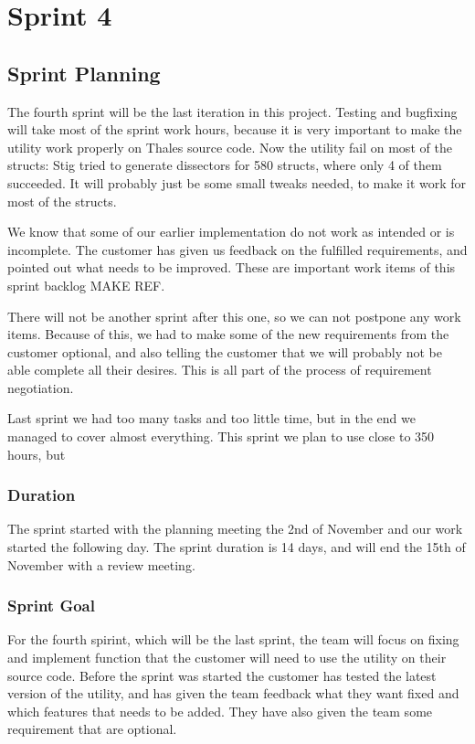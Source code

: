 \chapter{Sprint 4}


\section{Sprint Planning}
The fourth sprint will be the last iteration in this project. Testing and bugfixing will take most of the sprint work hours, because it is very important to make the utility work properly on Thales source code. Now the utility fail on most of the structs: Stig tried to generate dissectors for 580 structs, where only 4 of them succeeded. It will probably just be some small tweaks needed, to make it work for most of the structs.

We know that some of our earlier implementation do not work as intended or is incomplete. The customer has given us feedback on the fulfilled requirements, and pointed out what needs to be improved. These are important work items of this sprint backlog MAKE REF.

There will not be another sprint after this one, so we can not postpone any work items. Because of this, we had to make some of the new requirements from the customer optional, and also telling the customer that we will probably not be able complete all their desires. This is all part of the process of requirement negotiation.

Last sprint we had too many tasks and too little time, but in the end we managed to cover almost everything. This sprint we plan to use close to 350 hours, but 

\subsection{Duration}
The sprint started with the planning meeting the 2nd of November and our work started the following day. The sprint duration is 14 days, and will end the 15th of November with a review meeting. 


\subsection{Sprint Goal}
For the fourth spirint, which will be the last sprint, the team will focus on fixing and implement function that the customer will need to use the utility on their source code. Before the sprint was started the customer has tested the latest version of the utility, and has given the team feedback what they want fixed and which features that needs to be added. They have also given the team some requirement that are optional. 


